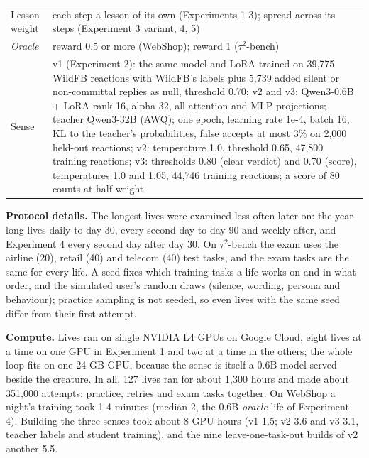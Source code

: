 \begin{longtable}[]{@{}
  >{\raggedright\arraybackslash}p{}
  >{\raggedright\arraybackslash}p{}@{}}
Lesson weight & each step a lesson of its own (Experiments 1-3); spread across its steps (Experiment 3 variant, 4, 5) \\
\emph{Oracle} & reward 0.5 or more (WebShop); reward 1 ($\tau^2$-bench) \\
Sense & v1 (Experiment 2): the same model and LoRA trained on 39,775 WildFB reactions with WildFB's labels plus 5,739 added silent or non-committal replies as null, threshold 0.70; v2 and v3: Qwen3-0.6B + LoRA rank 16, alpha 32, all attention and MLP projections; teacher Qwen3-32B (AWQ); one epoch, learning rate 1e-4, batch 16, KL to the teacher's probabilities, false accepts at most 3\% on 2,000 held-out reactions; v2: temperature 1.0, threshold 0.65, 47,800 training reactions; v3: thresholds 0.80 (clear verdict) and 0.70 (score), temperatures 1.0 and 1.05, 44,746 training reactions; a score of 80 counts at half weight \\
\end{longtable}

\textbf{Protocol details.} The longest lives were examined less often later on: the year-long lives daily to day 30, every second day to day 90 and weekly after, and Experiment 4 every second day after day 30. On $\tau^2$-bench the exam uses the airline (20), retail (40) and telecom (40) test tasks, and the exam tasks are the same for every life. A seed fixes which training tasks a life works on and in what order, and the simulated user's random draws (silence, wording, persona and behaviour); practice sampling is not seeded, so even lives with the same seed differ from their first attempt.

\textbf{Compute.} Lives ran on single NVIDIA L4 GPUs on Google Cloud, eight lives at a time on one GPU in Experiment 1 and two at a time in the others; the whole loop fits on one 24 GB GPU, because the sense is itself a 0.6B model served beside the creature. In all, 127 lives ran for about 1,300 hours and made about 351,000 attempts: practice, retries and exam tasks together. On WebShop a night's training took 1-4 minutes (median 2, the 0.6B \emph{oracle} life of Experiment 4). Building the three senses took about 8 GPU-hours (v1 1.5; v2 3.6 and v3 3.1, teacher labels and student training), and the nine leave-one-task-out builds of v2 another 5.5.


